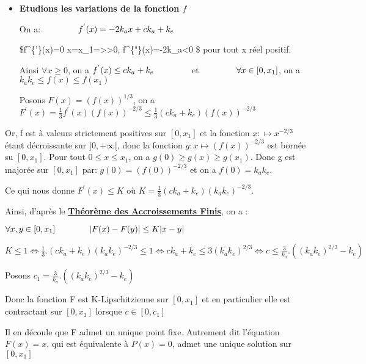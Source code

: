 \documentclass[11pt]{article}
\begin{document}
\begin{itemize}
\item
  \textbf{Etudions les variations de la fonction \(f\)}

  On a: \(\hspace{40px}f^{'}(x)=-2k_ax+ck_a+k_e\)

  \$f\^{}\{'\}(x)=0
  \iff x=x\_1=\textgreater{}\textgreater{}0\hspace{40px},
  \hspace{40px}f\^{}\{"\}(x)=-2k\_a\textless{}0 \$ pour tout x réel
  positif.

  Ainsi \(\forall x\geq 0\), on a \(f^{'}(x)\leq ck_a+k_e\hspace{40px}\)
  et \(\hspace{40px}\forall x\in [0,x_1]\), on a
  \(k_ak_e\leq f(x)\leq f(x_1)\)

  Posons \(F(x)=(f(x))^{1/3}\), on a
  \(F^{'}(x)=\frac{1}{3}f^{'}(x)(f(x))^{-2/3}\leq \frac{1}{3}(ck_a+k_e)(f(x))^{-2/3}\)
\end{itemize}

Or, f est à valeurs strictement positives sur \([0,x_1]\) et la fonction
\(x:\longmapsto x^{-2/3}\) étant décroissante sur \(]0,+\infty[\), donc
la fonction \(g:x\longmapsto (f(x))^{-2/3}\) est bornée su \([0,x_1]\).
Pour tout \(0\leq x \leq x_1\), on a \(g(0)\geq g(x) \geq g(x_1)\). Donc
g est majorée sur \([0,x_1]\) par: \(g(0)=(f(0))^{-2/3}\) et on a
\(f(0)=k_ak_e\).

Ce qui nous donne \(F^{'}(x)\leq K\) où
\(K=\frac{1}{3}(ck_a+k_e)(k_ak_e)^{-2/3}\).

Ainsi, d'après le
\href{https://fr.wikipedia.org/wiki/Th\%C3\%A9or\%C3\%A8me_des_accroissements_finis?oldformat=true}{\textbf{Théorème
des Accroissements Finis}}, on a :

\(\forall x,y \in [0,x_1] \hspace{40px} \lvert F(x)-F(y) \rvert \leq K\lvert x-y \rvert\)

\(K\leq 1 \iff \frac{1}{3}.(ck_a+k_e)(k_ak_e)^{-2/3}\leq 1 \iff ck_a+k_e \leq 3(k_ak_e)^{2/3}\iff c\leq \frac{3}{k_a}.((k_ak_e)^{2/3}-k_e)\)

Posons \(c_1 = \frac{3}{k_a}.((k_ak_e)^{2/3}-k_e)\)

Donc la fonction F est K-Lipschitzienne sur \([0,x_1]\) et en
particulier elle est contractant sur \([0,x_1]\) lorsque
\(c\in [0, c_1]\)

Il en découle que F admet un unique point fixe. Autrement dit l'équation
\(F(x)=x\), qui est équivalente à \(P(x)=0\), admet une unique solution
sur \([0,x_1]\)
\end{document}
